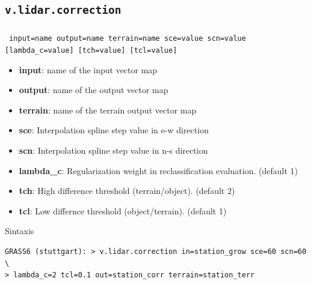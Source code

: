\subsection{\texttt{v.lidar.correction}}
\begin{frame}[fragile,shrink=5]
  \frametitle{}
  \begin{beamerboxesrounded}[shadow=true]{\textbf{}
    \texttt{ input=name  output=name  terrain=name  sce=value  scn=value 
    [lambda\_c=value]  [tch=value]  [tcl=value]}}
    \begin{itemize}
     \item \textbf{input}: name of the input vector map
     \item \textbf{output}: name of the output vector map
     \item \textbf{terrain}: name of the terrain output vector map
     \item \textbf{sce}: Interpolation spline step value in e-w direction
     \item \textbf{scn}: Interpolation spline step value in n-s direction
     \item \textbf{lambda\_c}: Regularization weight in reclassification evaluation. (default 1)
     \item \textbf{tch}: High difference threshold (terrain/object). (default 2)
     \item \textbf{tcl}: Low differnce threshold (object/terrain). (default 1)
    \end{itemize}
  \end{beamerboxesrounded}
  \begin{beamerboxesrounded}[shadow=true]{Sintaxis}
\scriptsize
\begin{verbatim}
GRASS6 (stuttgart): > v.lidar.correction in=station_grow sce=60 scn=60 \
> lambda_c=2 tcl=0.1 out=station_corr terrain=station_terr
\end{verbatim}
  \end{beamerboxesrounded}
\end{frame}
